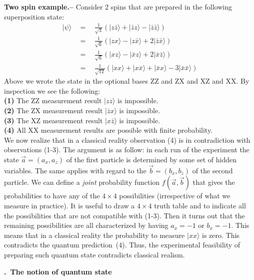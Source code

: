 \documentclass[onecolumn,fleqn, 11pt]{revtex4}
\newcommand{\beq}{\begin{eqnarray}}
\newcommand{\eeq}{\end{eqnarray}}
\renewcommand{\thesubsection}{\arabic{subsection}}
\renewcommand{\thesubsubsection}{\arabic{subsubsection}}
\newcommand{\sheadC}[1]
{
\addtocounter{subsubsection}{1}
\vspace{5mm}
{\bf \thesubsection.\thesubsubsection \ #1}  
\nopagebreak
\phantomsection
}
\begin{document}
{\bf Two spin example.-- }
Consider 2 spins that are prepared in the following superposition state: 
\beq
|\psi\rangle 
\ \ &=& \ \ \frac{1}{\sqrt{3}}\left(| z\bar{z} \rangle + | \bar{z}z \rangle - | \bar{z}\bar{z} \rangle  \right) \\
\ \ &=& \ \ \frac{1}{\sqrt{6}}\left(| zx \rangle - | z\bar{x} \rangle + 2 | \bar{z}\bar{x} \rangle  \right) \\
\ \ &=& \ \ \frac{1}{\sqrt{6}}\left(| xz \rangle - | \bar{x}z \rangle + 2 | \bar{x}\bar{z} \rangle  \right) \\
\ \ &=& \ \ \frac{1}{\sqrt{12}}\left(| xx \rangle + | x\bar{x} \rangle +  | \bar{x}x \rangle - 3 | \bar{x}\bar{x} \rangle \right)
\eeq
Above we wrote the state in the optional bases ZZ and ZX and XZ and XX.
By inspection we see the following: \\
{\bf \hspace*{5mm} (1)} The ZZ measurement result $| zz \rangle$ is impossible. \\
{\bf \hspace*{5mm} (2)} The ZX measurement result $| \bar{z}x \rangle$ is impossible. \\
{\bf \hspace*{5mm} (3)} The XZ measurement result $| x\bar{z} \rangle$ is impossible. \\
{\bf \hspace*{5mm} (4)} All XX measurement results are possible with finite probability. \\
We now realize that in a classical reality observation (4) is in contradiction 
with observations (1-3). The argument is as follow: in each run of the experiment 
the state ${\vec{a}=(a_x,a_z)}$ of the first particle is determined by some set of hidden variables. 
The same applies with regard to the ${\vec{b}=(b_x,b_z)}$ of the second particle. 
We can define a {\em joint} probability function $f\left(\vec{a},\vec{b}\right)$ that gives the 
probabilities to have any of the $4\times4$ possibilities (irrespective 
of what we measure in practice). 
It is useful to draw a $4\times4$ truth table and to indicate all 
the possibilities that are not compatible with (1-3). Then it turns out 
that the remaining possibilities are all characterized by 
having ${a_x=-1}$ or  ${b_x=-1}$. This means that in a classical
reality the probability to measure $| xx \rangle$ is zero.
This contradicts the quantum prediction~(4). Thus, the experimental feasibility 
of preparing such quantum state contradicts classical realism.


\sheadC{The notion of quantum state}
\end{document}

